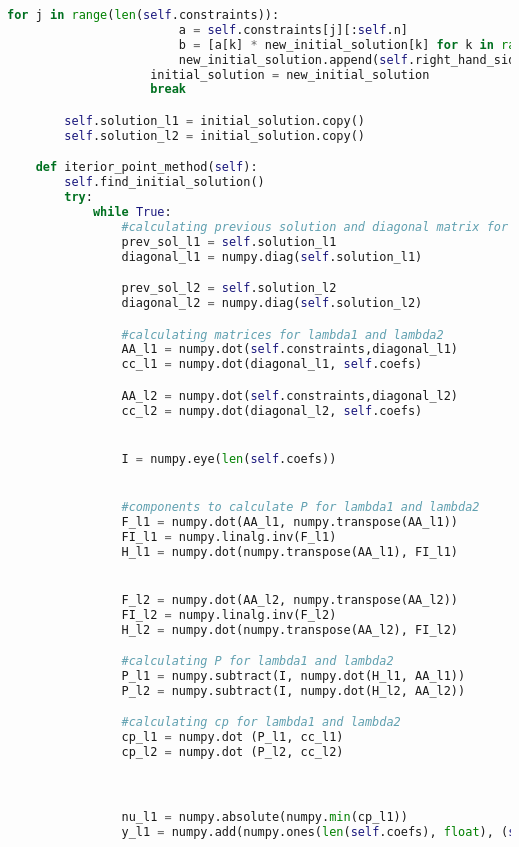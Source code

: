 \documentclass[12pt, legalpaper]{exam}
\begin{document}
\begin{lstlisting}[language=Python, caption=Программа на Python, label=lst:python-code]
                    for j in range(len(self.constraints)):
                        a = self.constraints[j][:self.n]
                        b = [a[k] * new_initial_solution[k] for k in range(len(a))]
                        new_initial_solution.append(self.right_hand_side[j] - sum(b))
                    initial_solution = new_initial_solution
                    break

        self.solution_l1 = initial_solution.copy()
        self.solution_l2 = initial_solution.copy()

    def iterior_point_method(self):
        self.find_initial_solution()
        try:
            while True:
                #calculating previous solution and diagonal matrix for lambda1 and lambda2
                prev_sol_l1 = self.solution_l1
                diagonal_l1 = numpy.diag(self.solution_l1)    

                prev_sol_l2 = self.solution_l2
                diagonal_l2 = numpy.diag(self.solution_l2)

                #calculating matrices for lambda1 and lambda2
                AA_l1 = numpy.dot(self.constraints,diagonal_l1)
                cc_l1 = numpy.dot(diagonal_l1, self.coefs)

                AA_l2 = numpy.dot(self.constraints,diagonal_l2)
                cc_l2 = numpy.dot(diagonal_l2, self.coefs)


                I = numpy.eye(len(self.coefs))


                #components to calculate P for lambda1 and lambda2
                F_l1 = numpy.dot(AA_l1, numpy.transpose(AA_l1))
                FI_l1 = numpy.linalg.inv(F_l1)
                H_l1 = numpy.dot(numpy.transpose(AA_l1), FI_l1)


                F_l2 = numpy.dot(AA_l2, numpy.transpose(AA_l2))
                FI_l2 = numpy.linalg.inv(F_l2)
                H_l2 = numpy.dot(numpy.transpose(AA_l2), FI_l2)

                #calculating P for lambda1 and lambda2
                P_l1 = numpy.subtract(I, numpy.dot(H_l1, AA_l1))
                P_l2 = numpy.subtract(I, numpy.dot(H_l2, AA_l2))

                #calculating cp for lambda1 and lambda2
                cp_l1 = numpy.dot (P_l1, cc_l1)
                cp_l2 = numpy.dot (P_l2, cc_l2)



                nu_l1 = numpy.absolute(numpy.min(cp_l1))
                y_l1 = numpy.add(numpy.ones(len(self.coefs), float), (self.alpha1/nu_l1) * cp_l1)


\end{lstlisting}
\end{document}
